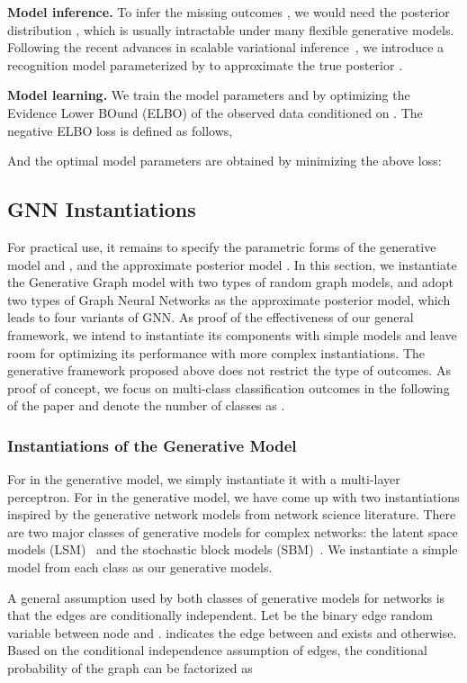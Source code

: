 \documentclass{article}
\newcommand{\vpara}[1]{\vspace{0.05in}\noindent\textbf{#1 }}
\begin{document}
\vpara{Model inference.} To infer the missing outcomes , we would need the posterior distribution , which is usually intractable under many flexible generative models. Following the recent advances in scalable variational inference~\cite{kingma2013auto,kingma2014semi}, we introduce a recognition model  parameterized by  to approximate the true posterior . 

\vpara{Model learning.} We train the model parameters  and  by optimizing the Evidence Lower BOund (ELBO) of the observed data  conditioned on . The negative ELBO loss  is defined as follows,

And the optimal model parameters are obtained by minimizing the above loss:


\subsection{GNN Instantiations}

For practical use, it remains to specify the parametric forms of the generative model  and , and the approximate posterior model . In this section, we instantiate the Generative Graph model with two types of random graph models, and adopt two types of Graph Neural Networks as the approximate posterior model, which leads to four variants of GNN. As proof of the effectiveness of our general framework, we intend to instantiate its components with simple models and leave room for optimizing its performance with more complex instantiations. The generative framework proposed above does not restrict the type of outcomes. As proof of concept, we focus on multi-class classification outcomes in the following of the paper and denote the number of classes as .  

\subsubsection{Instantiations of the Generative Model}

For  in the generative model, we simply instantiate it with a multi-layer perceptron. For  in the generative model, we have come up with two instantiations inspired by the generative network models from network science literature. There are two major classes of generative models for complex networks: the latent space models (LSM)~\cite{hoff2002latent} and the stochastic block models (SBM)~\cite{holland1983stochastic}. We instantiate a simple model from each class as our generative models. 

A general assumption used by both classes of generative models for networks is that the edges are conditionally independent. Let  be the binary edge random variable between node  and .  indicates the edge between  and  exists and  otherwise. Based on the conditional independence assumption of edges, the conditional probability of the graph  can be factorized as
\end{document}
